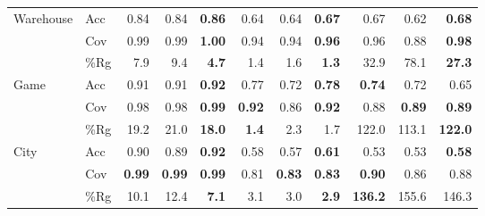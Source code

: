 \documentclass{ecai}
\begin{document}
\begin{table}[bth!]
\begin{tabular}{@{}ll|rrr|rrr|rrr@{}}
\midrule
\multirow{3}{*}{Warehouse} & Acc      & 0.84                    & 0.84                    & \textbf{0.86}           & 0.64                    & 0.64                    & \textbf{0.67}           & 0.67                    & 0.62                    & \textbf{0.68}           \\
                           & Cov      & 0.99                    & 0.99                    & \textbf{1.00}           & 0.94                    & 0.94                    & \textbf{0.96}           & 0.96                    & 0.88                    & \textbf{0.98}           \\
                           & \%Rg     & 7.9                     & 9.4                     & \textbf{4.7}            & 1.4                     & 1.6                     & \textbf{1.3}            & 32.9                    & 78.1                    & \textbf{27.3}           \\
\midrule
\multirow{3}{*}{Game}      & Acc      & 0.91                    & 0.91                    & \textbf{0.92}           & 0.77                    & 0.72                    & \textbf{0.78}           & \textbf{0.74}           & 0.72                    & 0.65                    \\
                           & Cov      & 0.98                    & 0.98                    & \textbf{0.99}           & \textbf{0.92}           & 0.86                    & \textbf{0.92}           & 0.88                    & \textbf{0.89}           & \textbf{0.89}           \\
                           & \%Rg     & 19.2                    & 21.0                    & \textbf{18.0}           & \textbf{1.4}            & 2.3                     & 1.7                     & 122.0                   & 113.1                   & \textbf{122.0}          \\
\midrule
\multirow{3}{*}{City}      & Acc      & 0.90                    & 0.89                    & \textbf{0.92}           & 0.58                    & 0.57                    & \textbf{0.61}           & 0.53                    & 0.53                    & \textbf{0.58}           \\
                           & Cov      & \textbf{0.99}           & \textbf{0.99}           & \textbf{0.99}           & 0.81                    & \textbf{0.83}           & \textbf{0.83}           & \textbf{0.90}           & 0.86                    & 0.88                    \\
                           & \%Rg     & 10.1                    & 12.4                    & \textbf{7.1}            & 3.1                     & 3.0                     & \textbf{2.9}            & \textbf{136.2}          & 155.6                   & 146.3                   \\

\end{tabular}
\end{table}
\end{document}
